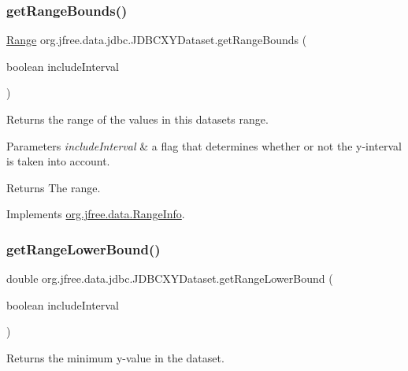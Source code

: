 \subsubsection{\texorpdfstring{get\+Range\+Bounds()}{getRangeBounds()}}
{\footnotesize\ttfamily \mbox{\hyperlink{classorg_1_1jfree_1_1data_1_1_range}{Range}} org.\+jfree.\+data.\+jdbc.\+J\+D\+B\+C\+X\+Y\+Dataset.\+get\+Range\+Bounds (\begin{DoxyParamCaption}\item[{boolean}]{include\+Interval }\end{DoxyParamCaption})}

Returns the range of the values in this dataset\textquotesingle{}s range.


\begin{DoxyParams}{Parameters}
{\em include\+Interval} & a flag that determines whether or not the y-\/interval is taken into account.\\
\hline
\end{DoxyParams}
\begin{DoxyReturn}{Returns}
The range. 
\end{DoxyReturn}


Implements \mbox{\hyperlink{interfaceorg_1_1jfree_1_1data_1_1_range_info_a2752094d868839b5565131a5bdd8e75e}{org.\+jfree.\+data.\+Range\+Info}}.

\mbox{\label{classorg_1_1jfree_1_1data_1_1jdbc_1_1_j_d_b_c_x_y_dataset_a8e50c93deb6df3331819894de3128a64}} 
\subsubsection{\texorpdfstring{get\+Range\+Lower\+Bound()}{getRangeLowerBound()}}
{\footnotesize\ttfamily double org.\+jfree.\+data.\+jdbc.\+J\+D\+B\+C\+X\+Y\+Dataset.\+get\+Range\+Lower\+Bound (\begin{DoxyParamCaption}\item[{boolean}]{include\+Interval }\end{DoxyParamCaption})}

Returns the minimum y-\/value in the dataset.


